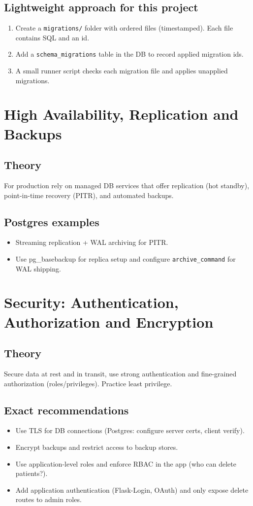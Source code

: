 \documentclass[11pt,a4paper]{article}
\begin{document}
\subsection{Lightweight approach for this project}
\begin{enumerate}
  \item Create a \texttt{migrations/} folder with ordered files (timestamped). Each file contains SQL and an id.
  \item Add a \texttt{schema_migrations} table in the DB to record applied migration ids.
  \item A small runner script checks each migration file and applies unapplied migrations.
\end{enumerate}

\section{High Availability, Replication and Backups}
\subsection{Theory}
For production rely on managed DB services that offer replication (hot standby), point-in-time recovery (PITR), and automated backups.

\subsection{Postgres examples}
\begin{itemize}
  \item Streaming replication + WAL archiving for PITR.
  \item Use pg_basebackup for replica setup and configure \texttt{archive_command} for WAL shipping.
\end{itemize}

\section{Security: Authentication, Authorization and Encryption}
\subsection{Theory}
Secure data at rest and in transit, use strong authentication and fine-grained authorization (roles/privileges). Practice least privilege.

\subsection{Exact recommendations}
\begin{itemize}
  \item Use TLS for DB connections (Postgres: configure server certs, client verify).
  \item Encrypt backups and restrict access to backup stores.
  \item Use application-level roles and enforce RBAC in the app (who can delete patients?).
  \item Add application authentication (Flask-Login, OAuth) and only expose delete routes to admin roles.
\end{itemize}
\end{document}
